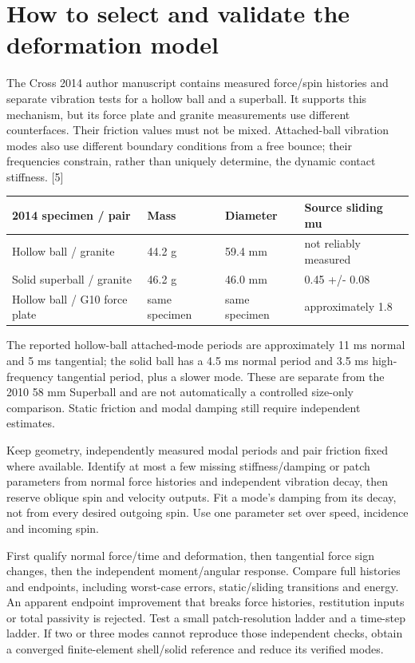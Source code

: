 \documentclass[10pt,a4paper]{article}
\begin{document}
\newpage
\section*{How to select and validate the deformation model}

The Cross 2014 author manuscript contains measured force/spin histories and separate
vibration tests for a hollow ball and a superball. It supports this mechanism, but
its force plate and granite measurements use different counterfaces. Their friction
values must not be mixed. Attached-ball vibration modes also use different boundary
conditions from a free bounce; their frequencies constrain, rather than uniquely
determine, the dynamic contact stiffness. [5]
\begin{center}\footnotesize\setlength{\tabcolsep}{4pt}
\begin{tabular}{llll}
\hline
2014 specimen / pair & Mass & Diameter & Source sliding mu\\\hline
Hollow ball / granite & 44.2 g & 59.4 mm & not reliably measured\\
Solid superball / granite & 46.2 g & 46.0 mm & 0.45 +/- 0.08\\
Hollow ball / G10 force plate & same specimen & same specimen & approximately 1.8\\
\hline\end{tabular}\end{center}
The reported hollow-ball attached-mode periods are approximately 11 ms normal and
5 ms tangential; the solid ball has a 4.5 ms normal period and 3.5 ms high-frequency
tangential period, plus a slower mode. These are separate from the 2010 58 mm
Superball and are not automatically a controlled size-only comparison. Static
friction and modal damping still require independent estimates.

Keep geometry, independently measured modal periods and pair friction fixed where
available. Identify at most a few missing stiffness/damping or patch parameters from
normal force histories and independent vibration decay, then reserve oblique spin
and velocity outputs. Fit a mode's damping from its decay, not from every desired
outgoing spin. Use one parameter set over speed, incidence and incoming spin.

First qualify normal force/time and deformation, then tangential force sign changes,
then the independent moment/angular response. Compare full histories and endpoints,
including worst-case errors, static/sliding transitions and energy. An apparent
endpoint improvement that breaks force histories, restitution inputs or total
passivity is rejected. Test a small patch-resolution ladder and a time-step ladder.
If two or three modes cannot reproduce those independent checks, obtain a converged
finite-element shell/solid reference and reduce its verified modes.
\end{document}
